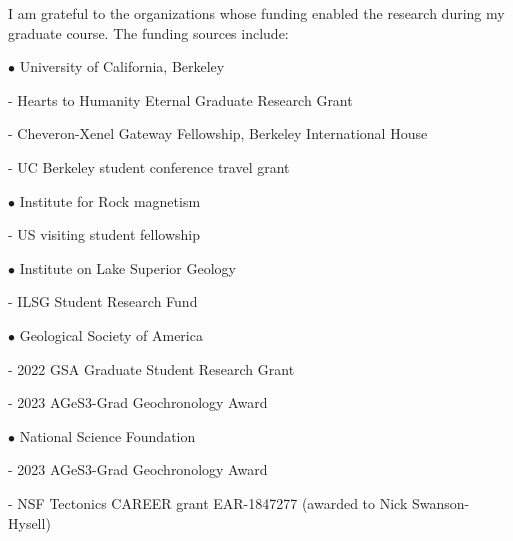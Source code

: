 \documentclass{ucbthesis}
\begin{document}
\begin{frontmatter}
\begin{acknowledgements}
I am grateful to the organizations whose funding enabled the research during my graduate course. The funding sources include:

\vspace{5mm}
$\bullet$ University of California, Berkeley
    \vspace{5mm}

    \hspace{\parindent} - Hearts to Humanity Eternal Graduate Research Grant
    \vspace{5mm}
    
    \hspace{\parindent} - Cheveron-Xenel Gateway Fellowship, Berkeley International House
    \vspace{5mm}
    
    \hspace{\parindent} - UC Berkeley student conference travel grant
\vspace{5mm}

$\bullet$ Institute for Rock magnetism
    \vspace{5mm}
    
    \hspace{\parindent} - US visiting student fellowship
    \vspace{5mm}
    
$\bullet$ Institute on Lake Superior Geology
    \vspace{5mm}
    
    \hspace{\parindent} - ILSG Student Research Fund
    \vspace{5mm}
    
$\bullet$ Geological Society of America
    \vspace{5mm}
    
    \hspace{\parindent} - 2022 GSA Graduate Student Research Grant 
    \vspace{5mm}
    
    \hspace{\parindent} - 2023 AGeS3-Grad Geochronology Award
    \vspace{5mm}
    
$\bullet$ National Science Foundation
    \vspace{5mm}

    \hspace{\parindent} - 2023 AGeS3-Grad Geochronology Award
    \vspace{5mm}
    
    \hspace{\parindent} - NSF Tectonics CAREER grant EAR-1847277 (awarded to Nick Swanson-Hysell)
    \vspace{5mm}
    

\end{acknowledgements}
\end{frontmatter}
\end{document}
